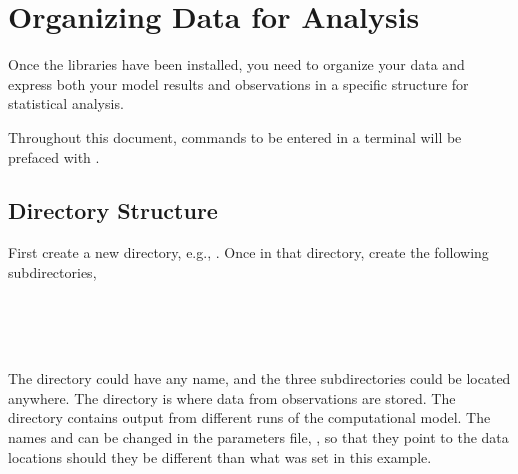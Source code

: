 \section{Organizing Data for Analysis}\label{sec:organizingdata}


Once the libraries have been installed, you need to organize your data and express both your model results and observations in a specific structure for statistical analysis. 

Throughout this document, commands to be entered in a terminal will be prefaced with \commandline{}.

\subsection{Directory Structure}
\label{sec:DirectoryStructure}

First create a new directory, e.g., . Once in that directory, create the following subdirectories,

\\
\\
\\

The directory  could have any name, and the three subdirectories could be located anywhere. The  directory is where data from observations are stored. The  directory contains output from different runs of the computational model. The names  and  can be changed in the parameters file, , so that they point to the data locations should they be different than what was set in this example.

